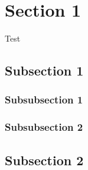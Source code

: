 \section{Section 1}
Test \cite*{MSI:Radars}
\subsection{Subsection 1}
\subsubsection{Subsubsection 1}
\subsubsection{Subsubsection 2}
\subsection{Subsection 2}